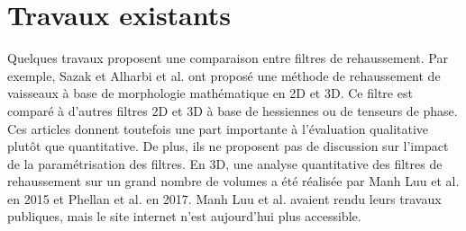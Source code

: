 \section{Travaux existants}
 Quelques travaux proposent une comparaison entre filtres de rehaussement. Par exemple, Sazak et Alharbi et al. \cite{Alharbi2018_TP_2D_3D} \cite{Sazak2019_bowler_hat_2D}  ont proposé une méthode de rehaussement de vaisseaux à base de morphologie mathématique en 2D et 3D. Ce filtre est comparé à d'autres filtres 2D et 3D à base de hessiennes ou de tenseurs de phase. Ces articles donnent toutefois une part importante à l'évaluation qualitative plutôt que quantitative. De plus, ils ne proposent pas de discussion sur l'impact de la paramétrisation des filtres. En 3D, une analyse quantitative des filtres de rehaussement sur un grand nombre de volumes a été réalisée par Manh Luu et al. en 2015 \cite{Luu2015_liver_vesselness_comparison} et Phellan et al. \cite{Phellan2017_Brain_vesselness_comparison} en 2017. Manh Luu et al. avaient rendu leurs travaux publiques, mais le site internet n'est aujourd'hui plus accessible.

